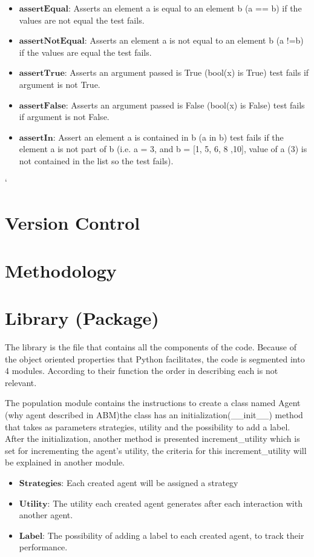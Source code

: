 \documentclass{article}
\begin{document}
\begin{itemize}
	\item $\textbf{assertEqual:}$ Asserts an element a is equal to an element  b (a == b) if the values are not equal the test fails.
	\item $\textbf{assertNotEqual:}$ Asserts an element a is not equal to an element b (a !=b) if the values are equal the test fails.
	\item $\textbf{assertTrue:}$ Asserts an argument passed is True (bool(x) is True) test fails if argument is not True. 
	\item $\textbf{assertFalse:}$ Asserts an argument passed is False (bool(x) is False) test fails if argument is not False.
	\item $\textbf{assertIn:}$ Assert an element a is contained in b (a in b) test fails if the element a is not part of b (i.e. a = 3, and b = [1, 5, 6, 8 ,10], value of a (3) is not contained in the list so the test fails).
\end{itemize}

`
\section{Version Control}


\section{Methodology}

\section{Library (Package)}\label{library_section}
The library is the file that contains all the components of the code. Because of the object oriented properties that Python facilitates, the code is segmented into 4 modules. According to their function the order in describing each is not relevant.

The population module contains the instructions to create a class named Agent (why agent described in ABM)the class has an initialization(\_\_init\_\_) method that takes as parameters strategies, utility and the possibility to add a label. After the initialization, another method is presented increment\_utility which is set for incrementing the agent’s utility, the criteria for this increment\_utility will be explained in another module.

\begin{itemize}
\item $\textbf{Strategies:}$ Each created agent will be assigned a strategy
\item $\textbf{Utility:}$ The utility each created agent generates after each interaction with another agent.
\item $\textbf{Label:}$ The possibility of adding a label to each created agent, to track their performance.
\end{itemize}
\end{document}
